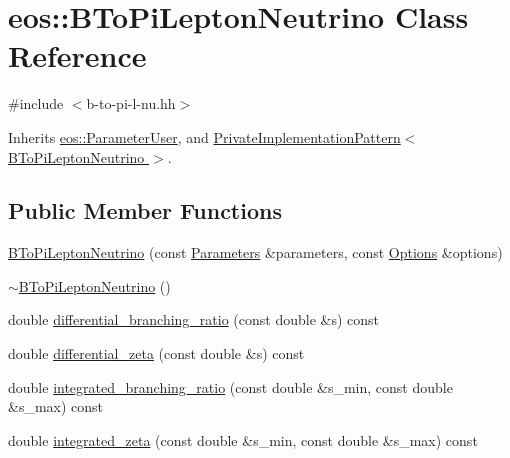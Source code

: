 \hypertarget{classeos_1_1BToPiLeptonNeutrino}{
\section{eos::BToPiLeptonNeutrino Class Reference}
\label{classeos_1_1BToPiLeptonNeutrino}
}


{\ttfamily \#include $<$b-\/to-\/pi-\/l-\/nu.hh$>$}

Inherits \hyperlink{classeos_1_1ParameterUser}{eos::ParameterUser}, and \hyperlink{classeos_1_1PrivateImplementationPattern}{PrivateImplementationPattern$<$ BToPiLeptonNeutrino $>$}.\subsection*{Public Member Functions}
\begin{DoxyCompactItemize}
\item 
\hyperlink{classeos_1_1BToPiLeptonNeutrino_a62aff0479721942c6b06693a23b42345}{BToPiLeptonNeutrino} (const \hyperlink{classeos_1_1Parameters}{Parameters} \&parameters, const \hyperlink{classeos_1_1Options}{Options} \&options)
\item 
\hyperlink{classeos_1_1BToPiLeptonNeutrino_a33601618dfaa42dc8893612fccf5451e}{$\sim$BToPiLeptonNeutrino} ()
\item 
double \hyperlink{classeos_1_1BToPiLeptonNeutrino_a07ce4913ec14c9509a77f3b917faacb8}{differential\_\-branching\_\-ratio} (const double \&s) const 
\item 
double \hyperlink{classeos_1_1BToPiLeptonNeutrino_a4b67b6e7c84ddb7e9f89e2ae4b8c9d55}{differential\_\-zeta} (const double \&s) const 
\item 
double \hyperlink{classeos_1_1BToPiLeptonNeutrino_a7fde1afb0cc7d836fd227828060901aa}{integrated\_\-branching\_\-ratio} (const double \&s\_\-min, const double \&s\_\-max) const 
\item 
double \hyperlink{classeos_1_1BToPiLeptonNeutrino_aa4cf04477445478224ca123f5842dc52}{integrated\_\-zeta} (const double \&s\_\-min, const double \&s\_\-max) const 
\end{DoxyCompactItemize}


